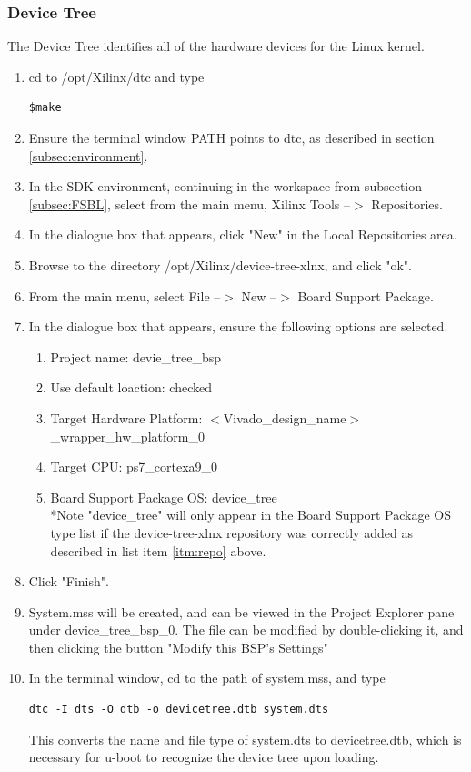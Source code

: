 \documentclass[12pt]{article}
\begin{document}
\subsubsection{Device Tree}
The Device Tree identifies all of the hardware devices for the Linux kernel.
\begin{enumerate}
\item  cd to /opt/Xilinx/dtc and type
\begin{lstlisting}
$make
\end{lstlisting}
\item Ensure the terminal window PATH points to dtc, as described in section \ref{subsec:environment}.
\item In the SDK environment, continuing in the workspace from subsection \ref{subsec:FSBL}, select from the main menu, Xilinx Tools --$>$ Repositories.
\item In the dialogue box that appears, click "New" in the Local Repositories area.
\item Browse to the directory /opt/Xilinx/device-tree-xlnx, and click "ok".\label{itm:repo}
\item From the main menu, select File --$>$ New --$>$ Board Support Package.
\item In the dialogue box that appears, ensure the following options are selected.
\begin{enumerate}
\item Project name: devie\_tree\_bsp
\item Use default loaction: checked
\item Target Hardware Platform: $<$Vivado\_design\_name$>$\_wrapper\_hw\_platform\_0
\item Target CPU: ps7\_cortexa9\_0
\item Board Support Package OS: device\_tree
\\ *Note "device\_tree" will only appear in the Board Support Package OS type list if the device-tree-xlnx repository was correctly added as described in list item \ref{itm:repo} above.
\end{enumerate}
\item Click "Finish".
\item System.mss will be created, and can be viewed in the Project Explorer pane under device\_tree\_bsp\_0.  The file can be modified by double-clicking it, and then clicking the button "Modify this BSP's Settings"
\item In the terminal window, cd to the path of system.mss, and type
\begin{lstlisting}
dtc -I dts -O dtb -o devicetree.dtb system.dts
\end{lstlisting}
This converts the name and file type of system.dts to devicetree.dtb, which is necessary for u-boot to recognize the device tree upon loading.
\end{enumerate}
\end{document}
